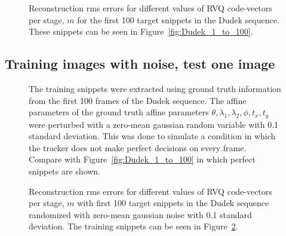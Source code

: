 								\begin{figure}
								\centering
								\subtable{\begin{tiny}\end{tiny}}
								\caption{Reconstruction rms errors for different values of RVQ code-vectors per stage, $m$ for the first 100 target snippets in the Dudek sequence.  These snippets can be seen in Figure~\ref{fig:Dudek_1_to_100}.}
								\label{fig:aRVQ_Dudek_first_100}
								\end{figure}

\clearpage
\newpage
\subsection{Training images with noise, test one image}


								\begin{figure}[h]
								\centering
								\caption{The training snippets were extracted using ground truth information from the first 100 frames of the Dudek sequence.  The affine parameters of the ground truth affine parameters $\theta, \lambda_1, \lambda_2, \phi, t_x, t_y$ were perturbed with a zero-mean gaussian random variable with 0.1 standard deviation.  This was done to simulate a condition in which the tracker does not make perfect decisions on every frame.  Compare with Figure~\ref{fig:Dudek_1_to_100} in which perfect snippets are shown.}
								\label{fig:aRVQ_dudek_first_100rand_snippets}
								\end{figure}

								\begin{figure}
								\centering
								\subtable{\begin{tiny}\end{tiny}}
								\caption{Reconstruction rms errors for different values of RVQ code-vectors per stage, $m$ with first 100 target snippets in the Dudek sequence randomized with zero-mean gaussian noise with 0.1 standard deviation.  The training snippets can be seen in Figure~\ref{fig:aRVQ_dudek_first_100rand_snippets}.}
								\label{fig:aRVQ_Dudek_first_100_rand}
								\end{figure}



